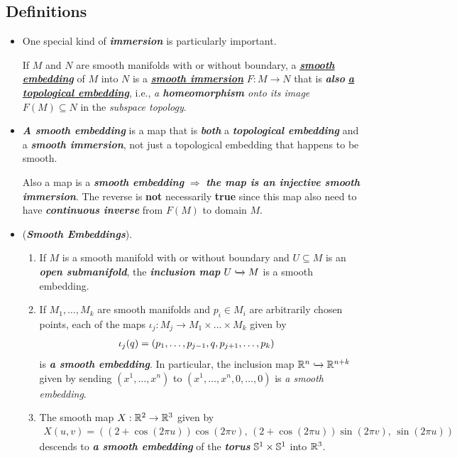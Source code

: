 \documentclass[11pt]{article}
\begin{document}
\subsection{Definitions}
\begin{itemize}
\item  One special kind of \emph{\textbf{immersion}} is particularly important.
\begin{definition}
If $M$ and $N$ are smooth manifolds with or without boundary, a  \underline{\emph{\textbf{smooth embedding}}} of $M$ into $N$ is a \underline{\emph{\textbf{smooth immersion}}} $F: M \rightarrow N$ that is \emph{\textbf{also}} \underline{\emph{\textbf{a topological embedding}}}, i.e., \emph{a \textbf{homeomorphism} onto its image} $F(M) \subseteq N$ in the \emph{subspace topology}. 
\end{definition}

\item \begin{remark}
\emph{\textbf{A smooth embedding}} is a map that is \emph{\textbf{both}} a \emph{\textbf{topological embedding}} and a \emph{\textbf{smooth immersion}}, not just a topological embedding that happens to be smooth. 

Also a map is a \textbf{\emph{smooth embedding}} $\Rightarrow$ \emph{\textbf{the map is an injective smooth immersion}}. The reverse is \textbf{not} necessarily \textbf{true} since this map also need to have \emph{\textbf{continuous inverse}} from $F(M)$ to domain $M$.
\end{remark}

\item \begin{example}(\emph{\textbf{Smooth Embeddings}}).
\begin{enumerate}
\item  If $M$ is a smooth manifold with or without boundary and $U \subseteq M$ is an \emph{\textbf{open submanifold}}, the \emph{\textbf{inclusion map}} $U \xhookrightarrow{} M$ is a smooth embedding.
\item If $M_1,\ldots,M_k$ are smooth manifolds and $p_i \in M_i$ are arbitrarily chosen points, each of the maps $\iota_{j}: M_j \rightarrow M_1\times \ldots \times M_k$ given by
\begin{align*}
\iota_{j}(q) &= \left(p_1, \ldots, p_{j-1}, q, p_{j+1}, \ldots, p_{k}\right)
\end{align*} is \emph{\textbf{a smooth embedding}}. In particular, the inclusion map ${\mathbb R}^n \xhookrightarrow{} {\mathbb R}^{n+k}$ given by sending $(x^1,\ldots,x^n)$ to $(x^1,\ldots,x^n, 0,\ldots, 0)$  is \emph{a smooth embedding}.
\item The smooth map $X: {\mathbb R}^2 \rightarrow {\mathbb R}^3$ given by
\begin{align*}
X(u,v) =  ((2+ \cos(2\pi u))\cos(2\pi v),\, (2+\cos(2\pi u))\sin(2\pi v),\,\sin(2\pi u))
\end{align*} descends to \emph{\textbf{a smooth embedding}} of the \emph{\textbf{torus}} ${\mathbb S}^1\times {\mathbb S}^1$ into ${\mathbb R}^3$.
\end{enumerate}
\end{example}


\end{itemize}
\end{document}
